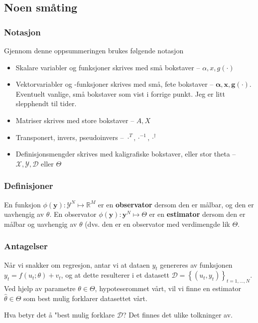 \subsection{Noen småting}
\subsubsection{Notasjon}
Gjennom denne oppsummeringen brukes følgende notasjon
\begin{itemize}
\item Skalare variabler og funksjoner skrives med små bokstaver -- $\alpha, x, g(\cdot)$
\item Vektorvariabler og -funksjoner skrives med små, fete bokstaver -- $\mathbf{\alpha}, \mathbf{x}, \mathbf{g(\cdot)}$. Eventuelt vanlige, små bokstaver som vist i forrige punkt. Jeg er litt slepphendt til tider.
\item Matriser skrives med store bokstaver -- $A, X$
\item Transponert, invers, pseudoinvers -- $\cdot^T, \cdot^{-1}, \cdot^\dagger$
\item Definisjonsmengder skrives med kaligrafiske bokstaver, eller stor theta -- $\mathcal{X}, \mathcal{Y}, \mathcal{D}$ eller $\Theta$
\end{itemize}

\subsubsection{Definisjoner}
En funksjon \(\phi(\boldsymbol{y}): \mathcal{Y}^{N} \mapsto \mathbb{R}^{M}\) er en \textbf{observator} dersom den er målbar, og den er uavhengig av $\theta$. En observator \(\phi(\boldsymbol{y}): \boldsymbol{y}^{N} \mapsto \Theta\) er en \textbf{estimator} dersom den er målbar og uavhengig av $\theta$ (dvs. den er en observator med verdimengde lik $\Theta$.

\subsubsection{Antagelser}
Når vi snakker om regresjon, antar vi at dataen $y_t$ genereres av funksjonen \(y_{t}=f\left(u_{t} ; \theta\right)+v_{t}\), og at dette resulterer i et datasett \(\mathcal{D}=\left\{\left(u_{t}, y_{t}\right)\right\}_{t=1, \ldots, N}\). Ved hjelp av parametre \(\theta \in \Theta\), hypoteserommet vårt, vil vi finne en estimator \(\widehat{\theta} \in \Theta\) som best mulig forklarer datasettet vårt.

Hva betyr det å "best mulig forklare $\mathcal{D}$? Det finnes det ulike tolkninger av.
